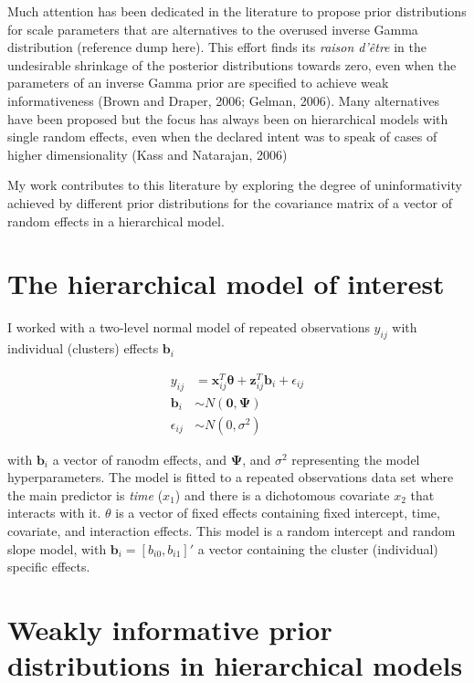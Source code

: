 \documentclass[a4paper]{article}
\begin{document}
Much attention has been dedicated in the literature to propose
prior distributions for scale parameters that are alternatives to the
overused inverse Gamma distribution (reference dump here). This effort
finds its \textit{raison d'être} in the undesirable shrinkage of the 
posterior distributions towards zero, even when the parameters of an 
inverse Gamma prior are specified to achieve weak informativeness (Brown 
and Draper, 2006; Gelman, 2006). Many alternatives have been proposed
but the focus has always been on hierarchical models with single random 
effects, even when the declared intent was to speak of cases of higher 
dimensionality (Kass and Natarajan, 2006)

My work contributes to this literature by exploring the degree of 
uninformativity achieved by different prior distributions for the 
covariance matrix of a vector of random effects in a hierarchical
model.

\section{The hierarchical model of interest}

I worked with a two-level normal model of repeated observations $y_{ij}$
with individual (clusters) effects $\bm{b}_i$

\begin{equation}
 \begin{split}
	y_{ij}& = \bm{x}^{T}_{ij} \bm{\theta} + \bm{z}^{T}_{ij}\bm{b}_i + \epsilon_{ij}\\
	\bm{b}_i& \sim N(\bm{0}, \bm{\Psi})\\
	\epsilon_{ij}& \sim N(0, \sigma^2)
 \end{split}
\end{equation}

with $\bm{b}_i$ a vector of ranodm effects, and $\bm{\Psi}$, and 
$\sigma^2$ representing the model hyperparameters.  The model is 
fitted to a repeated observations data set where the main predictor 
is \textit{time} ($x_1$) and there is a dichotomous covariate $x_2$ 
that interacts with it.  $\theta$ is a vector of fixed effects 
containing fixed intercept, time, covariate, and interaction effects.  
This model is a random intercept and random slope model, with $\bm{b}_i
 = [b_{i0}, b_{i1}]'$ a vector containing the cluster (individual) 
specific effects.

\section{Weakly informative prior distributions in hierarchical models}
\end{document}

